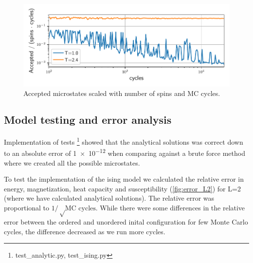 \begin{figure}[H]
  \centering
  \includegraphics[width=\textwidth]{../figures/accepted.pdf}
  \caption{Accepted microstates scaled with number of spins and MC cycles.}
  \label{fig:accepted}
\end{figure}

\subsection{Model testing and error analysis}

Implementation of tests \footnote{test\_analytic.py, test\_ising.py} showed that the
analytical solutions was correct down to an absolute error of \num{1e-12}  when
comparing against a brute force method where we created all the possible
microstates.


To test the implementation of the ising model we calculated the relative error
in energy, magnetization, heat capacity and susceptibility (\cref{fig:error_L2})
for L=2 (where we have calculated analytical solutions). The relative error
was proportional to $1/ \sqrt \text{MC cycles}$. While there were some
differences in the relative error between the ordered and unordered inital
configuration for few Monte Carlo cycles, the difference decreased as we run more
cycles.

